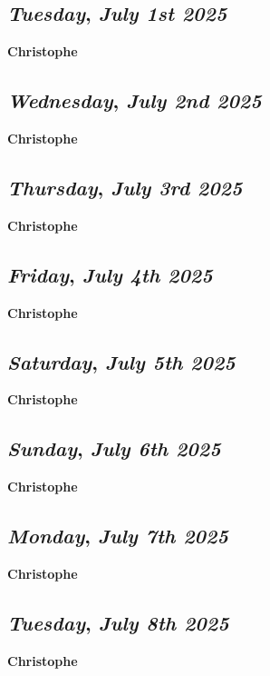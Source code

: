 \begin{center}
\section*{\month}
\end{center}

\def\day{\textit{July 1st 2025}}
\def\weekday{\textit{Tuesday}}
\subsection*{\weekday, \day}
\textbf {Christophe}

\def\day{\textit{July 2nd 2025}}
\def\weekday{\textit{Wednesday}}
\subsection*{\weekday, \day}
\textbf {Christophe}

\def\day{\textit{July 3rd 2025}}
\def\weekday{\textit{Thursday}}
\subsection*{\weekday, \day}
\textbf {Christophe}

\def\day{\textit{July 4th 2025}}
\def\weekday{\textit{Friday}}
\subsection*{\weekday, \day}
\textbf {Christophe}

\def\day{\textit{July 5th 2025}}
\def\weekday{\textit{Saturday}}
\subsection*{\weekday, \day}
\textbf {Christophe}

\def\day{\textit{July 6th 2025}}
\def\weekday{\textit{Sunday}}
\subsection*{\weekday, \day}
\textbf {Christophe}

\def\day{\textit{July 7th 2025}}
\def\weekday{\textit{Monday}}
\subsection*{\weekday, \day}
\textbf {Christophe}

\def\day{\textit{July 8th 2025}}
\def\weekday{\textit{Tuesday}}
\subsection*{\weekday, \day}
\textbf {Christophe}

